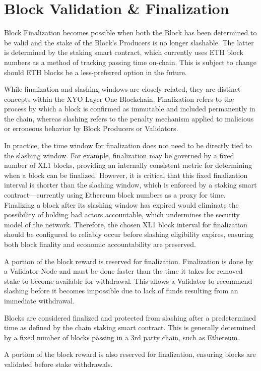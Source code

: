 \documentclass{article}
\begin{document}
\section{Block Validation \& Finalization}
Block Finalization becomes possible when both the Block has been determined to
be valid and the stake of the Block's Producers is no longer slashable. The
latter is determined by the staking smart contract, which currently uses ETH
block numbers as a method of tracking passing time on-chain. This is subject to
change should ETH blocks be a less-preferred option in the future.

While finalization and slashing windows are closely related, they are distinct
concepts within the XYO Layer One Blockchain. Finalization refers to the
process by which a block is confirmed as immutable and included permanently in
the chain, whereas slashing refers to the penalty mechanism applied to
malicious or erroneous behavior by Block Producers or Validators.

In practice, the time window for finalization does not need to be directly tied
to the slashing window. For example, finalization may be governed by a fixed
number of XL1 blocks, providing an internally consistent metric for determining
when a block can be finalized. However, it is critical that this fixed
finalization interval is shorter than the slashing window, which is enforced by
a staking smart contract—currently using Ethereum block numbers as a proxy for
time. Finalizing a block after its slashing window has expired would eliminate
the possibility of holding bad actors accountable, which undermines the
security model of the network. Therefore, the chosen XL1 block interval for
finalization should be configured to reliably occur before slashing eligibility
expires, ensuring both block finality and economic accountability are
preserved.

A portion of the block reward is reserved for finalization. Finalization is
done by a Validator Node and must be done faster than the time it takes for
removed stake to become available for withdrawal. This allows a Validator to
recommend slashing before it becomes impossible due to lack of funds resulting
from an immediate withdrawal.

Blocks are considered finalized and protected from slashing after a
predetermined time as defined by the chain staking smart contract. This is
generally determined by a fixed number of blocks passing in a 3rd party chain,
such as Ethereum.

A portion of the block reward is also reserved for finalization, ensuring
blocks are validated before stake withdrawals.
\end{document}
